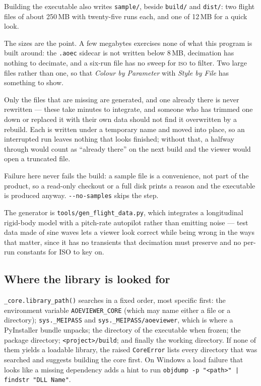 \documentclass[11pt,a4paper,oneside]{report}
\newcommand{\code}[1]{\texttt{#1}}
\newcommand{\key}[1]{\textsf{\small\fbox{#1}}}
\newcommand{\tab}[1]{\textsc{#1}}
\begin{document}
Building the executable also writes \code{sample/}, beside \code{build/} and
\code{dist/}: two flight files of about 250\,MB with twenty-five runs each, and
one of 12\,MB for a quick look.

The sizes are the point. A few megabytes exercises none of what this program is
built around: the \code{.aoec} sidecar is not written below 8\,MB, decimation
has nothing to decimate, and a six-run file has no sweep for \tab{iso} to
filter. Two large files rather than one, so that \emph{Colour by Parameter}
with \emph{Style by File} has something to show.

Only the files that are missing are generated, and one already there is never
rewritten --- these take minutes to integrate, and someone who has trimmed one
down or replaced it with their own data should not find it overwritten by a
rebuild. Each is written under a temporary name and moved into place, so an
interrupted run leaves nothing that looks finished; without that, a
\key{Ctrl+C} halfway through would count as ``already there'' on the next
build and the viewer would open a truncated file.

Failure here never fails the build: a sample file is a convenience, not part of
the product, so a read-only checkout or a full disk prints a reason and the
executable is produced anyway. \code{-{}-no-samples} skips the step.

The generator is \code{tools/gen\_flight\_data.py}, which integrates a
longitudinal rigid-body model with a pitch-rate autopilot rather than emitting
noise --- test data made of sine waves lets a viewer look correct while being
wrong in the ways that matter, since it has no transients that decimation must
preserve and no per-run constants for ISO to key on.

\subsection{Where the library is looked for}

\code{\_core.library\_path()} searches in a fixed order, most specific first:
the environment variable \code{AOEVIEWER\_CORE} (which may name either a file or
a directory); \code{sys.\_MEIPASS} and \code{sys.\_MEIPASS/aoeviewer}, which is
where a PyInstaller bundle unpacks; the directory of the executable when frozen;
the package directory; \code{<project>/build}; and finally the working
directory. If none of them yields a loadable library, the raised
\code{CoreError} lists every directory that was searched and suggests building
the core first. On Windows a load failure that looks like a missing dependency
adds a hint to run \code{objdump -p "<path>" | findstr "DLL Name"}.
\end{document}
